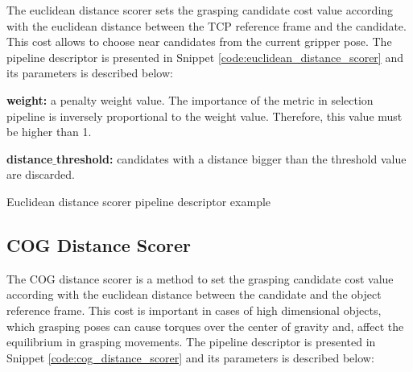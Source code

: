 The euclidean distance scorer sets the grasping candidate cost value according with the euclidean distance between the TCP  reference frame and the candidate. This cost allows to choose near candidates from the current gripper pose. The pipeline descriptor is presented in Snippet \ref{code:euclidean_distance_scorer} and its parameters is described below:

\begin{itemize_jp}
    \item \textbf{weight:} a penalty weight value. The importance of the metric in selection pipeline is inversely proportional to the weight value. Therefore, this value must be higher than 1.
    \item \textbf{distance$\_$threshold:} candidates with a distance bigger than the threshold value are discarded.
\end{itemize_jp}


\begin{snippet}[h!]
\centering
{}
\caption{Euclidean distance scorer pipeline descriptor example}
\label{code:euclidean_distance_scorer}
\end{snippet}

\subsection{\acl{COG} Distance Scorer}
\label{cap4:modular_grasping_architecture:sec:grasp_selection:subsec:cog_distance}

The \ac{COG} distance scorer is a method to set the grasping candidate cost value according with the euclidean distance between the candidate and the object reference frame. This cost is important in cases of high dimensional objects, which grasping poses can cause torques over the center of gravity and, affect the equilibrium in grasping movements. The pipeline descriptor is presented in Snippet \ref{code:cog_distance_scorer} and its parameters is described below:

